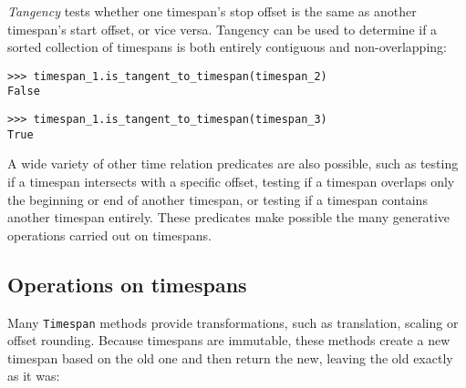\noindent \emph{Tangency} tests whether one timespan's stop offset is the same
as another timespan's start offset, or vice versa. Tangency can be used to
determine if a sorted collection of timespans is both entirely contiguous and
non-overlapping:

\begin{comment}
<abjad>
timespan_1.is_tangent_to_timespan(timespan_2)
timespan_1.is_tangent_to_timespan(timespan_3)
</abjad>
\end{comment}

\begin{abjadbookoutput}
\begin{singlespacing}
\vspace{-0.5\baselineskip}
\begin{lstlisting}
>>> timespan_1.is_tangent_to_timespan(timespan_2)
False
\end{lstlisting}
\begin{lstlisting}
>>> timespan_1.is_tangent_to_timespan(timespan_3)
True
\end{lstlisting}
\end{singlespacing}
\end{abjadbookoutput}

\noindent A wide variety of other time relation predicates are also possible,
such as testing if a timespan intersects with a specific offset, testing if a
timespan overlaps only the beginning or end of another timespan, or testing if
a timespan contains another timespan entirely. These predicates make possible
the many generative operations carried out on timespans.

\subsection{Operations on timespans} %
\label{ssec:operations-on-timespans}

Many \texttt{Timespan} methods provide transformations, such as translation,
scaling or offset rounding. Because timespans are immutable, these methods
create a new timespan based on the old one and then return the new, leaving
the old exactly as it was:

\begin{comment}
<abjad>
timespan = timespantools.Timespan(0, 15)
timespan.translate(3)
timespan.scale(3)
timespan.round_offsets(2)
</abjad>
\end{comment}

